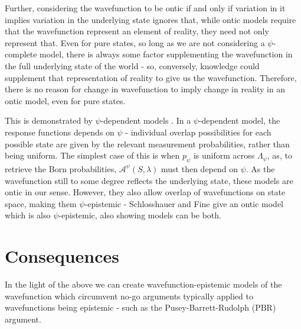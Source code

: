 \documentclass[superscriptaddress,reprint, floatfix, prl,nofootinbib]{revtex4-2}
\begin{document}
Further, considering the wavefunction to be ontic if and only if variation in it implies variation in the underlying state ignores that, while ontic models require that the wavefunction represent an element of reality, they need not only represent that. Even for pure states, so long as we are not considering a $\psi$-complete model, there is always some factor supplementing the wavefunction in the full underlying state of the world - so, conversely, knowledge could supplement that representation of reality to give us the wavefunction. Therefore, there is no reason for change in wavefunction to imply change in reality in an ontic model, even for pure states.

This is demonstrated by $\psi$-dependent models \cite{Schlosshauer2012Implications}. In a $\psi$-dependent model, the response functions depends on $\psi$ - individual overlap possibilities for each possible state are given by the relevant measurement probabilities, rather than being uniform. The simplest case of this is when $p_\psi$ is uniform across $\Lambda_\psi$, as, to retrieve the Born probabilities, $\mathcal{A}^\psi(S,\lambda)$ must then depend on $\psi$. As the wavefunction still to some degree reflects the underlying state, these models are ontic in our sense. However, they also allow overlap of wavefunctions on state space, making them $\psi$-epistemic - Schlosshauer and Fine give an ontic model which is also $\psi$-epistemic, also showing models can be both.

\section{Consequences}

In the light of the above we can create wavefunction-epistemic models of the wavefunction which circumvent no-go arguments typically applied to wavefunctions being epistemic - such as the Pusey-Barrett-Rudolph (PBR) argument.
\end{document}
